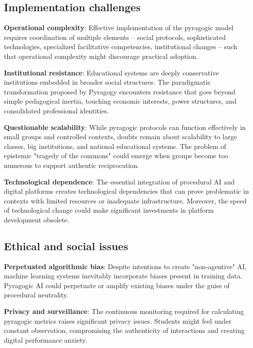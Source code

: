 \subsection{Implementation challenges}

\textbf{Operational complexity}:
Effective implementation of the pyragogic model requires coordination of multiple elements -- social protocols, sophisticated technologies, specialized facilitative competencies, institutional changes -- such that operational complexity might discourage practical adoption.

\textbf{Institutional resistance}:
Educational systems are deeply conservative institutions embedded in broader social structures. The paradigmatic transformation proposed by Pyragogy encounters resistance that goes beyond simple pedagogical inertia, touching economic interests, power structures, and consolidated professional identities.

\textbf{Questionable scalability}:
While pyragogic protocols can function effectively in small groups and controlled contexts, doubts remain about scalability to large classes, big institutions, and national educational systems. The problem of epistemic "tragedy of the commons" could emerge when groups become too numerous to support authentic reciprocation.

\textbf{Technological dependence}:
The essential integration of procedural AI and digital platforms creates technological dependencies that can prove problematic in contexts with limited resources or inadequate infrastructure. Moreover, the speed of technological change could make significant investments in platform development obsolete.

\subsection{Ethical and social issues}

\textbf{Perpetuated algorithmic bias}:
Despite intentions to create "non-agentive" AI, machine learning systems inevitably incorporate biases present in training data. Pyragogic AI could perpetuate or amplify existing biases under the guise of procedural neutrality.

\textbf{Privacy and surveillance}:
The continuous monitoring required for calculating pyragogic metrics raises significant privacy issues. Students might feel under constant observation, compromising the authenticity of interactions and creating digital performance anxiety.

